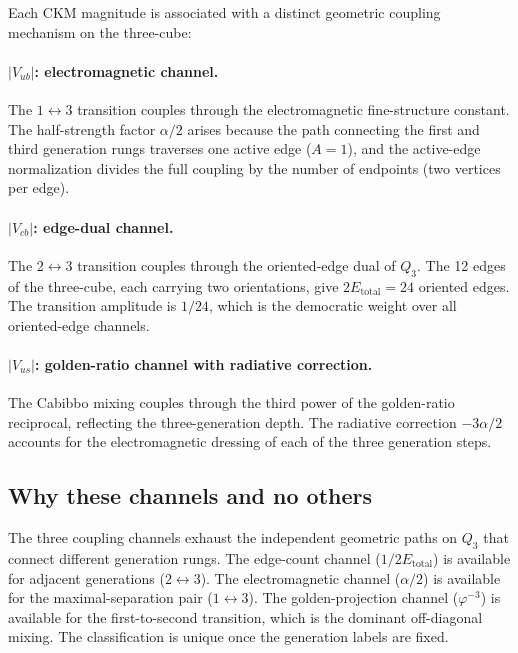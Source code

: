 \documentclass[11pt]{article}
\theoremstyle{remark}
\newcommand{\phig}{\varphi}
\newcommand{\Etot}{E_{\mathrm{total}}}
\begin{document}
Each CKM magnitude is associated with a distinct geometric
coupling mechanism on the three-cube:

\paragraph{$|V_{ub}|$: electromagnetic channel.}
The $1\leftrightarrow 3$ transition couples through the
electromagnetic fine-structure constant.  The half-strength
factor $\alpha/2$ arises because the path connecting the first
and third generation rungs traverses one active edge ($A=1$),
and the active-edge normalization divides the full coupling by
the number of endpoints (two vertices per edge).

\paragraph{$|V_{cb}|$: edge-dual channel.}
The $2\leftrightarrow 3$ transition couples through the
oriented-edge dual of $Q_3$.  The 12 edges of the three-cube,
each carrying two orientations, give $2\Etot=24$ oriented edges.
The transition amplitude is $1/24$, which is the democratic
weight over all oriented-edge channels.

\paragraph{$|V_{us}|$: golden-ratio channel with radiative
correction.}
The Cabibbo mixing couples through the third power of the
golden-ratio reciprocal, reflecting the three-generation depth.
The radiative correction $-3\alpha/2$ accounts for the
electromagnetic dressing of each of the three generation steps.

\subsection{Why these channels and no others}

The three coupling channels exhaust the independent geometric
paths on $Q_3$ that connect different generation rungs.  The
edge-count channel ($1/2\Etot$) is available for adjacent
generations ($2\leftrightarrow 3$).  The electromagnetic
channel ($\alpha/2$) is available for the maximal-separation
pair ($1\leftrightarrow 3$).  The golden-projection channel
($\phig^{-3}$) is available for the first-to-second transition,
which is the dominant off-diagonal mixing.  The classification
is unique once the generation labels are fixed.
\end{document}
